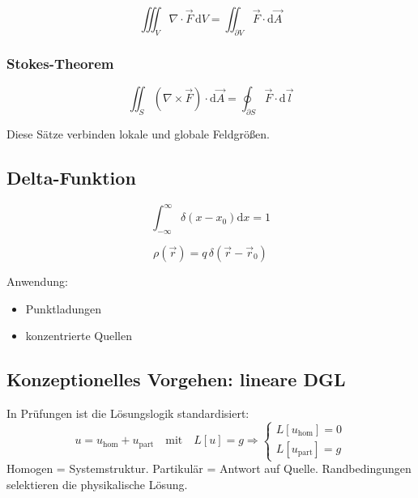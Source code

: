\documentclass[a4paper]{article}
\renewcommand{\dd}{\mathrm{d}}
\begin{document}
\[
\iiint_V \nabla\cdot\vec F\,\dd V
=
\iint_{\partial V}\vec F\cdot\dd\vec A
\]

\subsubsection{Stokes-Theorem}

\[
\iint_S (\nabla\times\vec F)\cdot\dd\vec A
=
\oint_{\partial S}\vec F\cdot\dd\vec l
\]

\begin{schema}
Diese Sätze verbinden lokale und globale Feldgrößen.
\end{schema}


\subsection{Delta-Funktion}

\[
\int_{-\infty}^{\infty}\delta(x-x_0)\dd x=1
\]

\[
\rho(\vec r)=q\,\delta(\vec r-\vec r_0)
\]

Anwendung:
\begin{itemize}
  \item Punktladungen
  \item konzentrierte Quellen
\end{itemize}


\subsection{Konzeptionelles Vorgehen: lineare DGL }

\begin{merke}
In Prüfungen ist die Lösungslogik standardisiert:
\[
u = u_{\text{hom}} + u_{\text{part}}
\quad\text{mit}\quad
L[u]=g \Rightarrow
\begin{cases}
L[u_{\text{hom}}]=0\\
L[u_{\text{part}}]=g
\end{cases}
\]
Homogen = Systemstruktur. Partikulär = Antwort auf Quelle. Randbedingungen selektieren die physikalische Lösung.
\end{merke}
\end{document}
